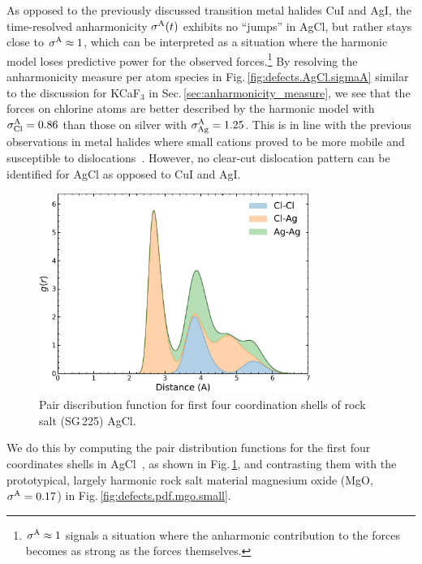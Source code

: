 %
As opposed to the previously discussed transition metal halides CuI and AgI, the time-resolved anharmonicity $\sigma^\mathrm{A} (t)$ exhibits no ``jumps'' in AgCl, but rather stays close to $\sigma^\mathrm{A} \approx 1$, which can be interpreted as a situation where the harmonic model loses predictive power for the observed forces.\footnote{$\sigma^\mathrm{A} \approx 1$ signals a situation where the anharmonic contribution to the forces becomes as strong as the forces themselves.} By resolving the anharmonicity measure per atom species in Fig.\,\ref{fig:defects.AgCl.sigmaA} similar to the discussion for KCaF$_3$ in Sec.\,\ref{sec:anharmonicity_measure}, we see that the forces on chlorine atoms are better described by the harmonic model with $\sigma^\mathrm{A}_{\rm Cl} = 0.86$ than those on silver with $\sigma^\mathrm{A}_{\rm Ag} = 1.25$. 
This is in line with the previous observations in metal halides where small cations proved to be more mobile and susceptible to dislocations~\cite{Boyce.1979,Brenner.2020}. However, no clear-cut dislocation pattern can be identified for AgCl as opposed to CuI and AgI.
%
\begin{figure}
	\centering
	\includegraphics[width=3.5in]{./data/plots/pdfs/agcl.pdf}
	\caption{Pair discribution function for first four coordination shells of rock salt (SG\,225) AgCl.
}
	\label{fig:defects.pdf.agcl}
\end{figure}
%
 We do this by computing the pair distribution functions for the first four coordinates shells in AgCl~\cite{AllenTildesley}, as shown in Fig.\,\ref{fig:defects.pdf.agcl}, and contrasting them with the prototypical, largely harmonic rock salt material magnesium oxide (MgO, $\sigma^\mathrm{A} = 0.17$) in Fig.\,\ref{fig:defects.pdf.mgo.small}. 
